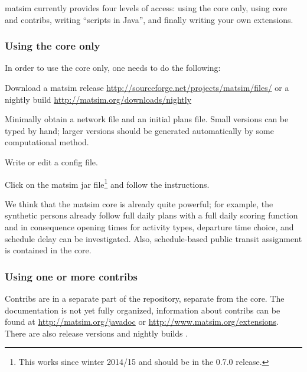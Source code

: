 \acrshort{matsim} currently provides four levels of access: using the core only, using core and contribs, writing ``scripts in Java'', and finally writing your own extensions.

\subsubsection{Using the core only}
\label{sec:using-core-only}
In order to use the core only, one needs to do the following:
\begin{compactitem}
\item Download a \acrshort{matsim} release \url{http://sourceforge.net/projects/matsim/files/} or a nightly build \url{http://matsim.org/downloads/nightly} %
\item Minimally obtain a network file and an initial plans file.  Small versions can be typed by hand; larger versions should be generated automatically by some computational method.
\item Write or edit a config file.
\item Click on the \acrshort{matsim} jar file\footnote{This works since winter 2014/15 and should be in the 0.7.0 release.} and follow the instructions. 
\end{compactitem}
We think that the \acrshort{matsim} core is already quite powerful; for example, the synthetic persons already follow full daily plans with a full daily scoring function and in consequence opening times for activity types, departure time choice, and schedule delay can be investigated.  Also, schedule-based public transit assignment is contained in the core.

\subsubsection{Using one or more contribs}
\label{sec:using-contribs}

Contribs are in a separate part of the repository, separate from the core.  The documentation is not yet fully organized, information about contribs can be found at \url{http://matsim.org/javadoc} or \url{http://www.matsim.org/extensions}.  There are also release versions   and nightly builds .

